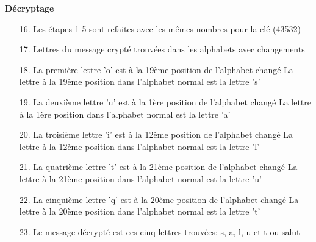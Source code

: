 \documentclass[a4paper,12pt]{report}
\begin{document}
\textbf{Décryptage}
\begin{enumerate}
\item [16.] Les étapes 1-5 sont refaites avec les mêmes nombres pour la clé (43532)
\item [17.] Lettres du message crypté trouvées dans les alphabets avec changements
\item [18.] La première lettre 'o' est à la 19ème position de l'alphabet changé\newline
La lettre à la 19ème position dans l'alphabet normal est la lettre 's'
\item [19.] La deuxième lettre 'u' est à la 1ère position de l'alphabet changé\newline
La lettre à la 1ère position dans l'alphabet normal est la lettre 'a'
\item [20.] La troisième lettre 'i' est à la 12ème position de l'alphabet changé\newline
La lettre à la 12ème position dans l'alphabet normal est la lettre 'l'
\item [21.] La quatrième lettre 't' est à la 21ème position de l'alphabet changé\newline
La lettre à la 21ème position dans l'alphabet normal est la lettre 'u'
\item [22.] La cinquième lettre 'q' est à la 20ème position de l'alphabet changé \newline
La lettre à la 20ème position dans l'alphabet normal est la lettre 't'
\item [23.] Le message décrypté est ces cinq lettres trouvées: s, a, l, u et t ou salut
\end{enumerate}
\end{document}
